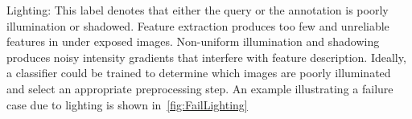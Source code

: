 \begin{itemln}
                \FailQuality{}

            \item Lighting:
            This label denotes that either the query or the
              \groundtrue{} annotation is poorly illumination or
              shadowed.
            Feature extraction produces too few and unreliable features
              in under exposed images.
            Non-uniform illumination and shadowing produces noisy
              intensity gradients that interfere with feature
              description.
            Ideally, a classifier could be trained to determine which
              images are poorly illuminated and select an appropriate
              preprocessing step.
            An example illustrating a failure case due to lighting is
              shown in~\cref{fig:FailLighting}

                \FailLighting{}




\end{itemln}
